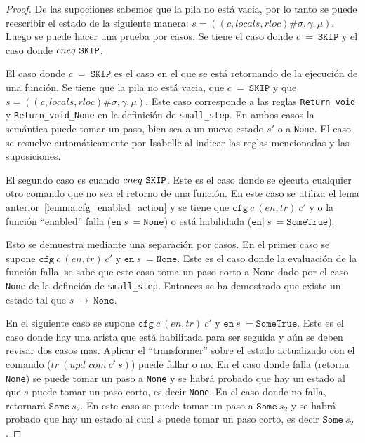 \begin{proof}
De las supociiones sabemos que la pila no está vacia, por lo tanto se puede reescribir el estado de la siguiente manera: $s = ((c, locals, rloc)\#\sigma,\gamma,\mu)$.
Luego se puede hacer una prueba por casos.
Se tiene el caso donde $c\ =\ \mathtt{SKIP}$ y el caso donde $c\\neq\ \mathtt{SKIP}$.

El caso donde $c\ =\ \mathtt{SKIP}$ es el caso en el que se está retornando de la ejecución de una función.
Se tiene que la pila no está vacia, que $c\ =\ \mathtt{SKIP}$ y que $s = ((c, locals, rloc)\#\sigma,\gamma,\mu)$.
Este caso corresponde a las reglas \verb|Return_void| y \verb|Return_void_None| en la definición de \verb|small_step|.
En ambos casos la semántica puede tomar un paso, bien sea a un nuevo estado $s'$ o a \verb|None|.
El caso se resuelve automáticamente por Isabelle al indicar las reglas mencionadas y las suposiciones.

El segundo caso es cuando $c\\neq\ \mathtt{SKIP}$.
Este es el caso donde se ejecuta cualquier otro comando que no sea el retorno de una función.
En este caso se utiliza el lema anterior~\ref{lemma:cfg_enabled_action} y se tiene que $\mathtt{cfg}\ c\ (en,tr)\ c'$ y o la función ``enabled'' falla ($\mathtt{en}\ s\ = \mathtt{None}$) o está habilidada ($\mathtt{en}|\ s\ = \mathtt{Some True}$).

Esto se demuestra mediante una separación por casos.
En el primer caso se supone $\mathtt{cfg}\ c\ (en,tr)\ c'$ y $\mathtt{en}\ s\ = \mathtt{None}$.
Este es el caso donde la evaluación de la función falla, se sabe que este caso toma un paso corto a None dado por el caso \verb|None| de la definción de \verb|small_step|.
Entonces se ha demostrado que existe un estado tal que $s\ \rightarrow\ \mathtt{None}$.

En el siguiente caso se supone $\mathtt{cfg}\ c\ (en,tr)\ c'$ y $\mathtt{en}\ s\ = \mathtt{Some True}$.
Este es el caso donde hay una arista que está habilitada para ser seguida y aún se deben revisar dos casos mas.
Aplicar el ``transformer'' sobre el estado actualizado con el comando ($tr\ (upd\_com\ c'\ s)$) puede fallar o no.
En el caso donde falla (retorna \verb|None|) se puede tomar un paso a \verb|None| y se habrá probado que hay un estado al que $s$ puede tomar un paso corto, es decir \verb|None|.
En el caso donde no falla, retornará $\mathtt{Some}\ s_{2}$.
En este caso se puede tomar un paso a $\mathtt{Some}\ s_{2}$ y se habrá probado que hay un estado al cual $s$ puede tomar un paso corto, es decir $\mathtt{Some}\ s_{2}$.
\end{proof}


